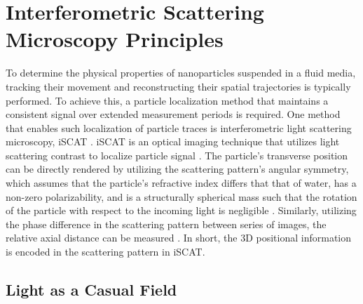 \chapter{Interferometric Scattering Microscopy Principles}

\label{chap:iscatprinciples}

To determine the physical properties of nanoparticles suspended in a fluid media, tracking their movement and reconstructing their spatial trajectories is typically performed. To achieve this, a particle localization method that maintains a consistent signal over extended measurement periods is required. One method that enables such localization of particle traces is interferometric light scattering microscopy, iSCAT \cite{taylor_interferometric_2018}. iSCAT is an optical imaging technique that utilizes light scattering contrast to localize particle signal \cite{taylor_interferometric_2018}. The particle's transverse position can be directly rendered by utilizing the scattering pattern's angular symmetry, which assumes that the particle's refractive index differs that that of water, has a non-zero polarizability, and is a structurally spherical mass such that the rotation of the particle with respect to the incoming light is negligible \cite{midtvedt_single-shot_2022, leeCharacterizingTrackingSingle2007, dewitPreciseCharacterizationNanometerscale2023, taylor_interferometric_2018}. Similarly, utilizing the phase difference in the scattering pattern between series of images, the relative axial distance can be measured \cite{kasaianLongRangeThreeDimensionalTracking2024}. In short, the 3D positional information is encoded in the scattering pattern in iSCAT. 


\clearpage
\section{Light as a Casual Field}

